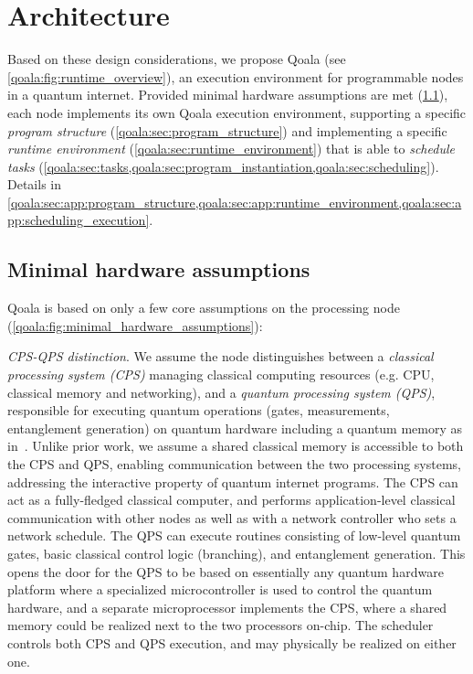 \section{Architecture}
\label{qoala:sec:architecture}

Based on these design considerations, we propose Qoala (see \cref{qoala:fig:runtime_overview}), an execution environment for programmable nodes in a quantum internet. 
Provided minimal hardware assumptions are met (\cref{qoala:sec:minimal_hardware_assumptions}), 
each node implements its own Qoala execution environment, supporting a specific \textit{program structure} (\cref{qoala:sec:program_structure})
and implementing a specific \textit{runtime environment} (\cref{qoala:sec:runtime_environment}) that is able to \textit{schedule tasks} (\cref{qoala:sec:tasks,qoala:sec:program_instantiation,qoala:sec:scheduling}).
Details in \cref{qoala:sec:app:program_structure,qoala:sec:app:runtime_environment,qoala:sec:app:scheduling_execution}.

\subsection{Minimal hardware assumptions}
\label{qoala:sec:minimal_hardware_assumptions}

Qoala is based on only a few core assumptions on the processing node (\cref{qoala:fig:minimal_hardware_assumptions}):

\textit{CPS-QPS distinction}. We assume the node distinguishes between a \textit{classical processing system (CPS)} managing classical computing resources (e.g. CPU, classical memory and networking), and a \textit{quantum processing system (QPS)}, responsible for executing quantum operations (gates, measurements, entanglement generation) on quantum hardware including a quantum memory as in~\cite{dahlberg2022netqasm, pompili2022experimental}.
Unlike prior work, we assume a shared classical memory is accessible to both the CPS and QPS, enabling communication between the two processing systems, addressing the interactive property of quantum internet programs.
The CPS can act as a fully-fledged classical computer, and performs application-level classical communication with other nodes as well as with a network controller who sets a network schedule.
The QPS can execute routines consisting of low-level quantum gates, basic classical control logic (branching), and entanglement generation.
This opens the door for the QPS to be based on essentially any quantum hardware platform where a specialized microcontroller is used to control the quantum hardware, and a separate microprocessor implements the CPS, where a shared memory could be realized next to the two processors on-chip.
The scheduler controls both CPS and QPS execution, and may physically be realized on either one.

